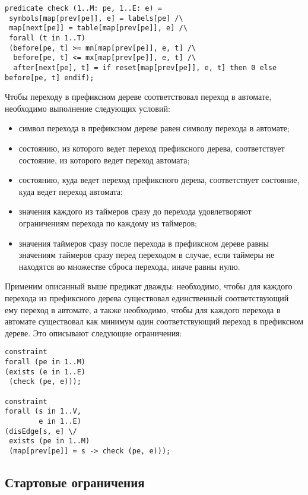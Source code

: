 \documentclass[times,specification,annotation]{itmo-student-thesis}
\begin{document}
\begin{lstlisting}[float=!h,language=Mzn,caption={Основной предикат на переходы},label={main_predicate}]
predicate check (1..M: pe, 1..E: e) =
 symbols[map[prev[pe]], e] = labels[pe] /\
 map[next[pe]] = table[map[prev[pe]], e] /\
 forall (t in 1..T)
 (before[pe, t] >= mn[map[prev[pe]], e, t] /\
  before[pe, t] <= mx[map[prev[pe]], e, t] /\
  after[next[pe], t] = if reset[map[prev[pe]], e, t] then 0 else before[pe, t] endif);
\end{lstlisting}

Чтобы переходу в префиксном дереве соответствовал переход в автомате, необходимо выполнение следующих условий:

\begin{itemize}
  \item символ перехода в префиксном дереве равен символу перехода в автомате;
  \item состоянию, из которого ведет переход префиксного дерева, соответствует состояние, из которого ведет переход автомата;
  \item состоянию, куда ведет переход префиксного дерева, соответствует состояние, куда ведет переход автомата;
  \item значения каждого из таймеров сразу до перехода удовлетворяют ограничениям перехода по каждому из таймеров;
  \item значения таймеров сразу после перехода в префиксном дереве равны значениям таймеров сразу перед переходом в случае,
    если таймеры не находятся во множестве сброса перехода, иначе равны нулю.
\end{itemize}

Применим описанный выше предикат дважды: необходимо, чтобы для каждого перехода из префиксного дерева существовал единственный
соответствующий ему переход в автомате, а также необходимо, чтобы для каждого перехода в автомате существовал как минимум один соответствующий
переход в префиксном дереве. Это описывают следующие ограничения:

\begin{lstlisting}[float=!h,language=Mzn,caption={Использование основного предиката},label={main_constraints}]
constraint
forall (pe in 1..M)
(exists (e in 1..E)
 (check (pe, e)));

constraint
forall (s in 1..V,
        e in 1..E)
(disEdge[s, e] \/
 exists (pe in 1..M)
 (map[prev[pe]] = s -> check (pe, e)));
\end{lstlisting}

\subsection{Стартовые ограничения}
\end{document}
